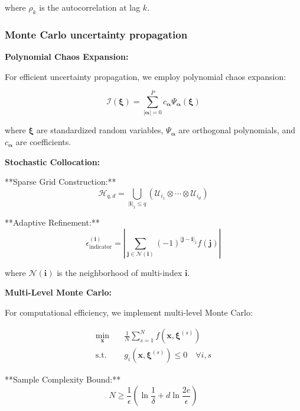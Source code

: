 \documentclass[11pt]{article}
\begin{document}
where $\rho_k$ is the autocorrelation at lag $k$.

\subsubsection{Monte Carlo uncertainty propagation}

\textbf{Polynomial Chaos Expansion:}

For efficient uncertainty propagation, we employ polynomial chaos expansion:

\begin{equation}
\mathcal{I}(\boldsymbol{\xi}) = \sum_{|\boldsymbol{\alpha}|=0}^{P} c_{\boldsymbol{\alpha}} \Psi_{\boldsymbol{\alpha}}(\boldsymbol{\xi})
\end{equation}

where $\boldsymbol{\xi}$ are standardized random variables, $\Psi_{\boldsymbol{\alpha}}$ are orthogonal polynomials, and $c_{\boldsymbol{\alpha}}$ are coefficients.

\textbf{Stochastic Collocation:}

**Sparse Grid Construction:**
\begin{equation}
\mathcal{H}_{q,d} = \bigcup_{|\boldsymbol{i}|_1 \leq q} (\mathcal{U}_{i_1} \otimes \cdots \otimes \mathcal{U}_{i_d})
\end{equation}

**Adaptive Refinement:**
\begin{equation}
\epsilon_{\text{indicator}}^{(\boldsymbol{i})} = \left| \sum_{\boldsymbol{j} \in \mathcal{N}(\boldsymbol{i})} (-1)^{|\boldsymbol{j}-\boldsymbol{i}|_1} f(\boldsymbol{j}) \right|
\end{equation}

where $\mathcal{N}(\boldsymbol{i})$ is the neighborhood of multi-index $\boldsymbol{i}$.

\textbf{Multi-Level Monte Carlo:}

For computational efficiency, we implement multi-level Monte Carlo:

\begin{align}
\min_{\mathbf{x}} \quad &\frac{1}{N} \sum_{s=1}^{N} f(\mathbf{x}, \boldsymbol{\xi}^{(s)}) \\
\text{s.t.} \quad &g_i(\mathbf{x}, \boldsymbol{\xi}^{(s)}) \leq 0 \quad \forall i, s
\end{align}

**Sample Complexity Bound:**
\begin{equation}
N \geq \frac{1}{\epsilon} \left(\ln\frac{1}{\delta} + d \ln\frac{2e}{\epsilon}\right)
\end{equation}
\end{document}
